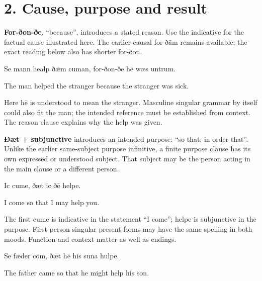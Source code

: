 \section*{2. Cause, purpose and result}

\textbf{For-ðon-ðe}, “because”, introduces a stated reason. Use the indicative for the factual cause illustrated here. The earlier causal for-ðām remains available; the exact reading below also has shorter for-ðon.

Se mann healp ðǣm cuman, for-ðon-ðe hē wæs untrum.

The man helped the stranger because the stranger was sick.

Here hē is understood to mean the stranger. Masculine singular grammar by itself could also fit the man; the intended reference must be established from context. The reason clause explains why the help was given.

\textbf{Ðæt + subjunctive} introduces an intended purpose: “so that; in order that”. Unlike the earlier same-subject purpose infinitive, a finite purpose clause has its own expressed or understood subject. That subject may be the person acting in the main clause or a different person.

Ic cume, ðæt ic ðē helpe.

I come so that I may help you.

The first cume is indicative in the statement “I come”; helpe is subjunctive in the purpose. First-person singular present forms may have the same spelling in both moods. Function and context matter as well as endings.

Se fæder cōm, ðæt hē his suna hulpe.

The father came so that he might help his son.

